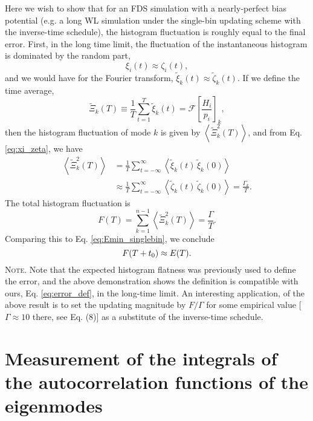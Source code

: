 \documentclass[reprint, superscriptaddress, floatfix]{revtex4-1}
\newcommand{\note}[1]{{\color{DarkGreen}\footnotesize \textsc{Note.} #1}}
\begin{document}
Here we wish to show that for an FDS simulation
with a nearly-perfect bias potential
(e.g. a long WL simulation under the single-bin updating scheme
with the inverse-time schedule),
the histogram fluctuation
is roughly equal to the final error.
%
First, in the long time limit, the fluctuation of
the instantaneous histogram is dominated by the random part,
%
\begin{equation}
  \xi_i(t) \approx \zeta_i(t)
  ,
  \label{eq:xi_zeta}
\end{equation}
and we would have for the Fourier transform,
$\tilde \xi_k(t) \approx \tilde \zeta_k(t).$
%
If we define the time average,
$$
\tilde \Xi_k(T) \equiv \frac 1 T \sum_{t = 1}^T \tilde \xi_k(t)
=\mathcal F\left[ \frac{ H_i } { p_i } \right]_k
,
$$
then the histogram fluctuation of mode $k$ is given by
$\left\langle \tilde \Xi_k^2(T) \right\rangle$,
and from Eq. \eqref{eq:xi_zeta}, we have
\begin{align*}
\left\langle \tilde \Xi_k^2(T) \right\rangle
&=
\frac{1}{T}
\sum_{t=-\infty}^\infty
\left\langle
  \tilde \xi_k(t) \, \tilde \xi_k(0)
\right\rangle
\\
&\approx
\frac{1}{T}
\sum_{t=-\infty}^\infty
\left\langle
  \tilde \zeta_k(t) \, \tilde \zeta_k(0)
\right\rangle
=
\frac{ \Gamma_k } { T }
.
\end{align*}
%
The total histogram fluctuation is
$$
F(T)
=
\sum_{k=1}^{n-1} \left\langle \tilde \Xi_k^2(T) \right\rangle
=
\frac{ \Gamma } { T }.
$$
%
Comparing this to Eq. \eqref{eq:Emin_singlebin},
we conclude
\begin{equation}
  F(T+t_0) \approx E(T)
  .
  \notag
\end{equation}
%
\note{
Note that the expected histogram flatness
was previously used to define the error\cite{zhou2005, zhou2008},
and the above demonstration shows the definition
is compatible with ours, Eq. \eqref{eq:error_def}, in the long-time limit.
An interesting application\cite{zhou2008},
of the above result is
to set the updating magnitude by $F/\Gamma$
for some empirical value [$\Gamma \approx 10$ there, see Eq. (8)]
as a substitute of the inverse-time schedule.
}




\section{\label{sec:Gamma_measure}
Measurement of the integrals of the autocorrelation functions of the eigenmodes
}
\end{document}
